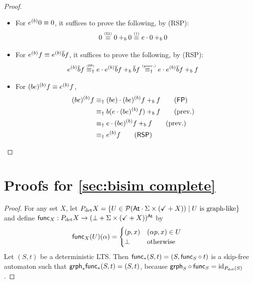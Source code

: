 \documentclass[orivec,envcountsect,envcountsame]{llncs}
\begin{document}
\begin{proof}
\begin{itemize}
		\item
		For $e {\mathbin{^{(b)}}} 0 \equiv 0$, it suffices to prove the following, by (\textsf{RSP}):
		\[
		0
		\stackrel{\text{\tiny(\textsf{G1})}}{\equiv} 0 +_b 0
		\stackrel{\text{\tiny(\(\dagger\))}}{\equiv} e \cdot 0 +_b 0
		\]

		\item
		For $e {\mathbin{^{(b)}}} f \equiv e {\mathbin{^{(b)}}} \overline{b}f$, it suffices to prove the following, by (\textsf{RSP}):
		\[
		e {\mathbin{^{(b)}}} \overline{b}f
		\stackrel{\text{\tiny(\textsf{FP})}}{\equiv_\dagger} e \cdot e {\mathbin{^{(b)}}} \overline{b}f +_b \overline{b}f
		\stackrel{\text{\tiny(prev.)}}{\equiv_\dagger} e \cdot e {\mathbin{^{(b)}}} \overline{b}f +_b f
		\]

		\item
		For \((be) {\mathbin{^{(b)}}} f \equiv e {\mathbin{^{(b)}}} f\),
		\begin{align*}
			(be) \while b f
			&\equiv_\dagger (be)\cdot (be)\while b f +_b f \tag{\textsf{FP}}\\
			&\equiv_\dagger b(e\cdot (be)\while b f) +_b f \tag{prev.}\\
			&\equiv_\dagger e\cdot (be)\while b f +_b f \tag{prev.} \\
			&\equiv_\dagger e \while b f \tag{\textsf{RSP}}
		\end{align*}
	\end{itemize}
\end{proof}


\section{Proofs for \cref{sec:bisim complete}}

\lemmadeterministiccharacterisation*

\begin{proof}
	For any set \(X\), let \(P_{\det}X = \{U \in \mathcal{P}(\mathsf{At} \cdot \Sigma \times (\checkmark + X)) \mid U~\text{is graph-like}\}\) and define \(\mathsf{func}_X : P_{\det}X \to (\bot + \Sigma \times (\checkmark + X))^{\mathsf{At}}\) by
 \[
	 \mathsf{func}_X(U)(\alpha) =
        \begin{cases}
        (p, x) & (\alpha p, x) \in U \\
        \bot & \text{otherwise}
        \end{cases}
 \]
 Let \((S, t)\) be a deterministic LTS\@. Then \(\mathsf{func}_*(S, t) = (S, \mathsf{func}_S \circ t)\) is a skip-free automaton such that \(\mathsf{grph}_*\mathsf{func}_*(S, t) = (S, t)\), because \(\mathsf{grph}_S\circ \mathsf{func}_S = \operatorname{id}_{P_{\det} (S)}\).
\end{proof}
\end{document}
